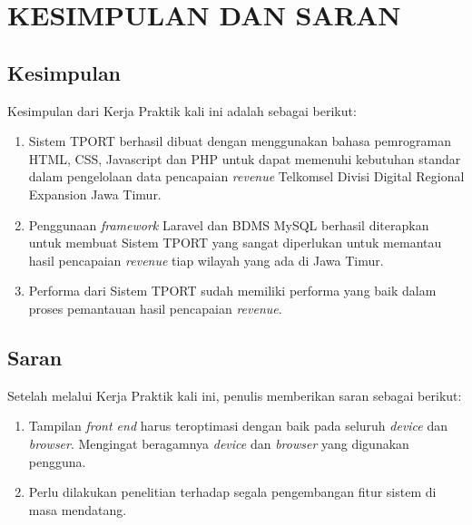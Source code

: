 \chapter{KESIMPULAN DAN SARAN}

\section{Kesimpulan}
Kesimpulan dari Kerja Praktik kali ini adalah sebagai berikut:
\begin{enumerate}
\item Sistem TPORT berhasil dibuat dengan menggunakan bahasa pemrograman HTML, CSS, Javascript dan PHP untuk dapat memenuhi kebutuhan standar dalam pengelolaan data pencapaian \textit{revenue} Telkomsel Divisi Digital Regional Expansion Jawa Timur.
\item Penggunaan \textit{framework} Laravel dan BDMS MySQL berhasil diterapkan untuk membuat Sistem TPORT yang sangat diperlukan untuk memantau hasil pencapaian \textit{revenue} tiap wilayah yang ada di Jawa Timur.
\item Performa dari Sistem TPORT sudah memiliki performa yang baik dalam proses pemantauan hasil pencapaian \textit{revenue}.
\end{enumerate}

\section{Saran}
Setelah melalui Kerja Praktik kali ini, penulis memberikan saran sebagai berikut:
\begin{enumerate}
\item Tampilan \textit{front end} harus teroptimasi dengan baik pada seluruh \textit{device} dan \textit{browser}. Mengingat beragamnya \textit{device} dan \textit{browser} yang digunakan pengguna.
\item Perlu dilakukan penelitian terhadap segala pengembangan fitur sistem di masa mendatang.
\end{enumerate}